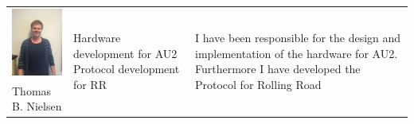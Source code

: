 \begin{tabular}[c]{|p{3cm}| p{5cm} | p{6cm}|}
	\phantom{Test}
	\includegraphics[width=3cm]{Introduction/TeamPictures/ThomasN} & \multirow{2}{5cm}{Hardware development for AU2 \newline \newline Protocol development for RR} & \multirow{2}{6cm}{I have been responsible for the design and implementation of the hardware for AU2. Furthermore I have developed the Protocol for Rolling Road} \\
	Thomas B. \newline Nielsen & & \\ \hline
\end{tabular}